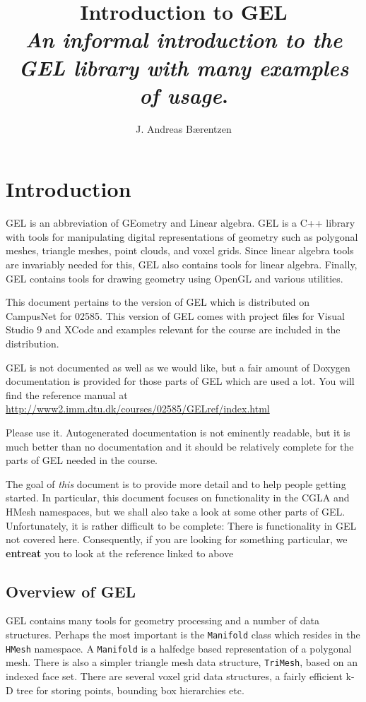 \documentclass[a4paper]{article}
\author{J. Andreas B{\ae}rentzen}
\title{Introduction to GEL\\\vspace{0.25cm} \normalsize
\textit{An informal introduction to the GEL library with many examples of usage}.}
\begin{document}
\maketitle
\tableofcontents
\newpage
%
%
\section{Introduction}
%
%
\sloppy
GEL is an abbreviation of GEometry and Linear algebra. GEL is a C++ library with tools for manipulating digital representations of geometry such as polygonal meshes, triangle meshes, point clouds, and voxel grids. Since linear algebra tools are invariably needed for this, GEL also contains tools for linear algebra. Finally, GEL contains tools for drawing geometry using OpenGL and various utilities.

This document pertains to the version of GEL which is distributed on CampusNet for 02585. This version of GEL comes with project files for Visual Studio 9 and XCode and examples relevant for the course are included in the distribution.

GEL is not documented as well as we would like, but a fair amount of Doxygen documentation is provided for those parts of GEL which are used a lot. You will find the reference manual at \href{http://www2.imm.dtu.dk/courses/02585/GELref/index.html}{http://www2.imm.dtu.dk/courses/02585/GELref/index.html}

Please use it. Autogenerated documentation is not eminently readable, but it is much better than no documentation and it should be relatively complete for the parts of GEL needed in the course. 

The goal of \textit{this} document is to provide more detail and to help people getting started. In particular, this document focuses on functionality in the CGLA and HMesh namespaces, but we shall also take a look at some other parts of GEL. Unfortunately, it is rather difficult to be complete: There is functionality in GEL not covered here. Consequently, if you are looking for something particular, we \textbf{entreat } you to look at the reference linked to above
\subsection{Overview of GEL}

GEL contains many tools for geometry processing and a number of data structures. Perhaps the most important is the \texttt{Manifold} class which resides in the \texttt{HMesh} namespace. A \texttt{Manifold} is a halfedge based representation of a polygonal mesh. There is also a simpler triangle mesh data structure, \texttt{TriMesh}, based on an indexed face set. There are several voxel grid data structures, a fairly efficient k-D tree for storing points, bounding box hierarchies etc.
\end{document}
